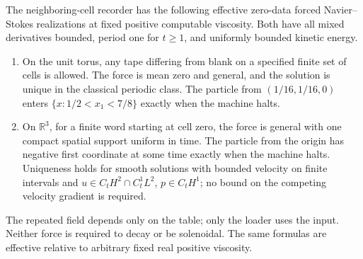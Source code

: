 \begin{theorem}
\label{thm:sa-neighbor-realizations}
The neighboring-cell recorder has the following effective zero-data
forced Navier--Stokes realizations at fixed positive computable viscosity.
Both have all mixed derivatives bounded, period one for $t\ge1$, and
uniformly bounded kinetic energy.
\begin{enumerate}
\item On the unit torus, any tape differing from blank on a specified
finite set of cells is allowed.  The force is mean zero and general,
and the solution is unique in the classical periodic class.  The particle
from $(1/16,1/16,0)$ enters $\{x:1/2<x_1<7/8\}$ exactly when the
machine halts.
\item On $\mathbb R^3$, for a finite word starting at cell zero, the
force is general with one compact spatial support uniform in time.
The particle from the origin has negative first coordinate at some time
exactly when the machine halts.  Uniqueness holds for smooth solutions
with bounded velocity on finite intervals and
$u\in C_tH^2\cap C_t^1L^2$, $p\in C_tH^1$; no bound on the competing
velocity gradient is required.
\end{enumerate}
The repeated field depends only on the table; only the loader uses the
input.  Neither force is required to decay or be solenoidal.  The same
formulas are effective relative to arbitrary fixed real positive viscosity.
\end{theorem}
